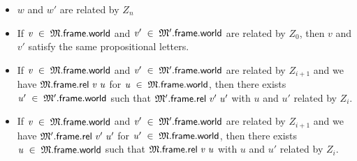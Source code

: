 \documentclass[letterpaper]{article}
\renewcommand{\HOLinline}[1]{\ensuremath{#1}}
\begin{document}
\begin{itemize}
  \item $w$ and $w'$ are related by $Z_n$
  \item If \HOLinline{\HOLFreeVar{v}\;\HOLSymConst{\HOLTokenIn{}}\;\HOLFreeVar{\ensuremath{\mathfrak{M}}}.\HOLFieldName{frame}.\HOLFieldName{world}} and \HOLinline{\HOLFreeVar{v\sp{\prime}}\;\HOLSymConst{\HOLTokenIn{}}\;\HOLFreeVar{\ensuremath{\mathfrak{M}'}}.\HOLFieldName{frame}.\HOLFieldName{world}} are related by $Z_0$, then $v$ and $v'$ satisfy the same propositional letters.
  \item If \HOLinline{\HOLFreeVar{v}\;\HOLSymConst{\HOLTokenIn{}}\;\HOLFreeVar{\ensuremath{\mathfrak{M}}}.\HOLFieldName{frame}.\HOLFieldName{world}} and \HOLinline{\HOLFreeVar{v\sp{\prime}}\;\HOLSymConst{\HOLTokenIn{}}\;\HOLFreeVar{\ensuremath{\mathfrak{M}'}}.\HOLFieldName{frame}.\HOLFieldName{world}} are related by $Z_{i+1}$ and we have \HOLinline{\HOLFreeVar{\ensuremath{\mathfrak{M}}}.\HOLFieldName{frame}.\HOLFieldName{rel}\;\HOLFreeVar{v}\;\HOLFreeVar{u}} for \HOLinline{\HOLFreeVar{u}\;\HOLSymConst{\HOLTokenIn{}}\;\HOLFreeVar{\ensuremath{\mathfrak{M}}}.\HOLFieldName{frame}.\HOLFieldName{world}}, then there exists \HOLinline{\HOLFreeVar{u\sp{\prime}}\;\HOLSymConst{\HOLTokenIn{}}\;\HOLFreeVar{\ensuremath{\mathfrak{M}'}}.\HOLFieldName{frame}.\HOLFieldName{world}} such that \HOLinline{\HOLFreeVar{\ensuremath{\mathfrak{M}'}}.\HOLFieldName{frame}.\HOLFieldName{rel}\;\HOLFreeVar{v\sp{\prime}}\;\HOLFreeVar{u\sp{\prime}}} with $u$ and $u'$ related by $Z_i$.
  \item If \HOLinline{\HOLFreeVar{v}\;\HOLSymConst{\HOLTokenIn{}}\;\HOLFreeVar{\ensuremath{\mathfrak{M}}}.\HOLFieldName{frame}.\HOLFieldName{world}} and \HOLinline{\HOLFreeVar{v\sp{\prime}}\;\HOLSymConst{\HOLTokenIn{}}\;\HOLFreeVar{\ensuremath{\mathfrak{M}'}}.\HOLFieldName{frame}.\HOLFieldName{world}} are related by $Z_{i+1}$ and we have \HOLinline{\HOLFreeVar{\ensuremath{\mathfrak{M}'}}.\HOLFieldName{frame}.\HOLFieldName{rel}\;\HOLFreeVar{v\sp{\prime}}\;\HOLFreeVar{u\sp{\prime}}} for \HOLinline{\HOLFreeVar{u\sp{\prime}}\;\HOLSymConst{\HOLTokenIn{}}\;\HOLFreeVar{\ensuremath{\mathfrak{M}}}.\HOLFieldName{frame}.\HOLFieldName{world}}, then there exists \HOLinline{\HOLFreeVar{u}\;\HOLSymConst{\HOLTokenIn{}}\;\HOLFreeVar{\ensuremath{\mathfrak{M}}}.\HOLFieldName{frame}.\HOLFieldName{world}} such that \HOLinline{\HOLFreeVar{\ensuremath{\mathfrak{M}}}.\HOLFieldName{frame}.\HOLFieldName{rel}\;\HOLFreeVar{v}\;\HOLFreeVar{u}} with $u$ and $u'$ related by $Z_i$.
\end{itemize}
\end{document}
